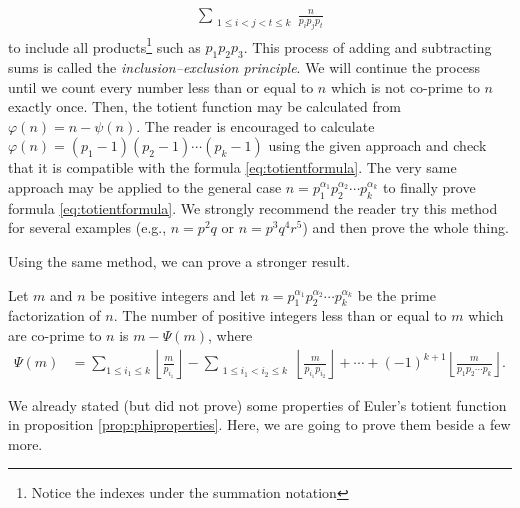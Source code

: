 \documentclass[12pt]{subfile}
\begin{document}
			\begin{align*}
				\sum\limits_{\substack{1\leq i<j<t\leq k}} \frac{n}{p_ip_jp_t}
			\end{align*}
		to include all products\footnote{Notice the indexes under the summation notation} such as $p_1p_2p_3$. This process of adding and subtracting sums is called the \textit{inclusion--exclusion principle}. We will continue the process until we count every number less than or equal to $n$ which is not co-prime to $n$ exactly once. Then, the totient function may be calculated from $\varphi(n) = n - \psi(n)$. The reader is encouraged to calculate $\varphi(n) = (p_1-1)(p_2-1) \cdots (p_k-1)$ using the given approach and check that it is compatible with the formula \eqref{eq:totientformula}. The very same approach may be applied to the general case $n= p_1^{\alpha_1} p_2^{\alpha_2} \cdots p_k^{\alpha_k}$ to finally prove formula \eqref{eq:totientformula}. We strongly recommend the reader try this method for several examples (e.g., $n=p^2q$ or $n = p^3 q^4r^5$) and then prove the whole thing.
		
		Using the same method, we can prove a stronger result.
		
		\begin{theorem}
			Let $m$ and $n$ be positive integers and let $n= p_1^{\alpha_1} p_2^{\alpha_2} \cdots p_k^{\alpha_k}$ be the prime factorization of $n$. The number of positive integers less than or equal to $m$ which are co-prime to $n$ is $m - \Psi(m)$, where
			\begin{align*}
			\Psi(m) &= \sum_{1 \leq i_1 \leq k} \left\lfloor\frac{m}{p_{i_1}} \right\rfloor - \sum_{\substack{1 \leq i_1<i_2 \leq k}} \left\lfloor\frac{m}{p_{i_1}p_{i_2}} \right\rfloor + \cdots + (-1)^{k+1} \left\lfloor\frac{m}{p_1p_2\cdots p_k} \right\rfloor.
			\end{align*}
		\end{theorem}
		We already stated (but did not prove) some properties of Euler's totient function in proposition \eqref{prop:phiproperties}. Here, we are going to prove them beside a few more.
		
\end{document}
